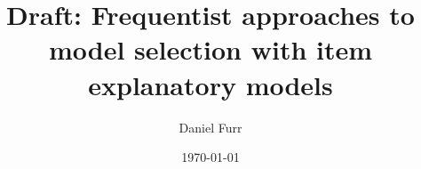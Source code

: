 \documentclass{article}
\begin{document}
\author{Daniel Furr}
\date{\today}

%

\title{Draft: Frequentist approaches to model selection with item explanatory models}
\maketitle


%

\printbibliography
\end{document}
